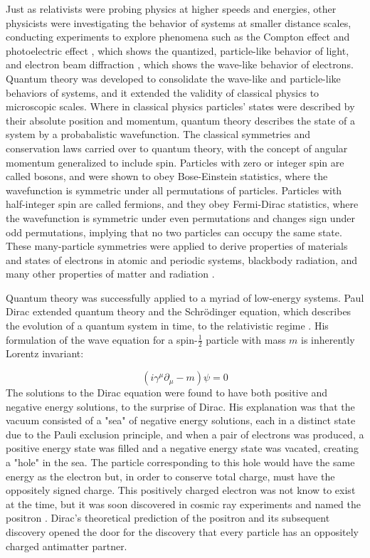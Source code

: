 \indent Just as relativists were probing physics at higher speeds and energies, other physicists were investigating the behavior of systems at smaller distance scales, conducting experiments to explore phenomena such as the Compton effect \cite{PhysRev.21.483} and photoelectric effect \cite{Einstein:1905cc}, which shows the quantized, particle-like behavior of light, and electron beam diffraction \cite{Davisson:1927ta}, which shows the wave-like behavior of electrons. Quantum theory was developed to consolidate the wave-like and particle-like behaviors of systems, and it extended the validity of classical physics to microscopic scales. Where in classical physics particles' states were described by their absolute position and momentum, quantum theory describes the state of a system by a probabalistic wavefunction. The classical symmetries and conservation laws carried over to quantum theory, with the concept of angular momentum generalized to include spin. Particles with zero or integer spin are called bosons, and were shown to obey Bose-Einstein statistics, where the wavefunction is symmetric under all permutations of particles. Particles with half-integer spin are called fermions, and they obey Fermi-Dirac statistics, where the wavefunction is symmetric under even permutations and changes sign under odd permutations, implying that no two particles can occupy the same state. These many-particle symmetries were applied to derive properties of materials and states of electrons in atomic and periodic systems, blackbody radiation, and many other properties of matter and radiation \cite{Shankar}.

\indent Quantum theory was successfully applied to a myriad of low-energy systems. Paul Dirac extended quantum theory and the Schr\"odinger equation, which describes the evolution of a quantum system in time, to the relativistic regime \cite{Diracqm}. His formulation of the wave equation for a spin-$\frac{1}{2}$ particle with mass $m$ is inherently Lorentz invariant:

\begin{equation}
(i \gamma^\mu \partial_\mu - m)\psi = 0
\end{equation}
The solutions to the Dirac equation were found to have both positive and negative energy solutions, to the surprise of Dirac. His explanation was that the vacuum consisted of a "sea" of negative energy solutions, each in a distinct state due to the Pauli exclusion principle, and when a pair of electrons was produced, a positive energy state was filled and a negative energy state was vacated, creating a "hole" in the sea. The particle corresponding to this hole would have the same energy as the electron but, in order to conserve total charge, must have the oppositely signed charge. This positively charged electron was not know to exist at the time, but it was soon discovered in cosmic ray experiments and named the positron \cite{PhysRev.43.491}. Dirac's theoretical prediction of the positron and its subsequent discovery opened the door for the discovery that every particle has an oppositely charged antimatter partner. 


